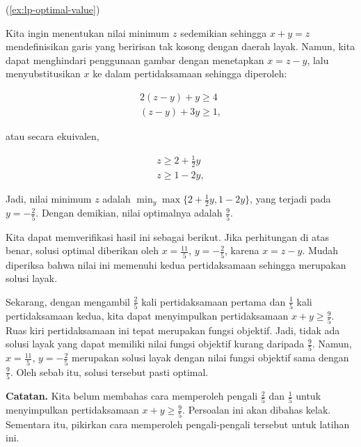 \begin{solution}(\ref{ex:lp-optimal-value})

Kita ingin menentukan nilai minimum \(z\) sedemikian sehingga \(x+y=z\)
mendefinisikan garis yang beririsan tak kosong dengan daerah layak.
Namun, kita dapat menghindari penggunaan gambar dengan menetapkan \(x=z-y\), lalu
menyubstitusikan \(x\) ke dalam pertidaksamaan sehingga diperoleh:

\begin{eqnarray*}
2(z-y) + y \geq 4 \\
(z-y) + 3y \geq 1,
\end{eqnarray*}

atau secara ekuivalen,

\begin{eqnarray*}
z \geq 2+\frac{1}{2}y \\
z \geq 1-2y,
\end{eqnarray*}

Jadi, nilai minimum \(z\) adalah
\(\displaystyle \min_y \max \{ 2+\frac{1}{2}y, 1-2y\}\), yang terjadi pada
\(y = -\frac{2}{5}\). Dengan demikian, nilai optimalnya adalah \(\frac{9}{5}\).

Kita dapat memverifikasi hasil ini sebagai berikut. Jika perhitungan
di atas benar, solusi optimal diberikan oleh
\(x = \frac{11}{5}\), \(y = -\frac{2}{5}\), karena \(x = z - y\). Mudah
diperiksa bahwa nilai ini memenuhi kedua pertidaksamaan sehingga merupakan
solusi layak.

Sekarang, dengan mengambil \(\frac{2}{5}\) kali pertidaksamaan pertama dan
\(\frac{1}{5}\) kali pertidaksamaan kedua, kita dapat menyimpulkan
pertidaksamaan \(x+y \geq \frac{9}{5}\). Ruas kiri
pertidaksamaan ini tepat merupakan fungsi objektif. Jadi, tidak ada solusi
layak yang dapat memiliki nilai fungsi objektif kurang daripada \(\frac{9}{5}\).
Namun, \(x = \frac{11}{5}\), \(y = -\frac{2}{5}\) merupakan solusi layak
dengan nilai fungsi objektif sama dengan \(\frac{9}{5}\). Oleh sebab itu,
solusi tersebut pasti optimal.

\textbf{Catatan.} Kita belum membahas cara memperoleh pengali
\(\frac{2}{5}\) dan \(\frac{1}{5}\) untuk menyimpulkan
pertidaksamaan \(x+y \geq \frac{9}{5}\). Persoalan ini akan
dibahas kelak. Sementara itu, pikirkan cara memperoleh pengali-pengali
tersebut untuk latihan ini.
\end{solution}


